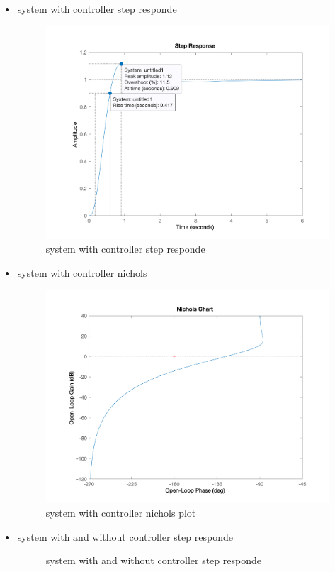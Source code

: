 \begin{itemize}
    \item system with controller step responde
    \begin{figure}[H]
        \caption{system with controller step responde}
        \centering
        \includegraphics[width=12cm]{../Figure/Q3/Q3_system_controller_respond.png}
    \end{figure}
    \item system with controller nichols
    \begin{figure}[H]
        \caption{system with controller nichols plot}
        \centering
        \includegraphics[width=12cm]{../Figure/Q3/Q3_system_controller_nichols.png}
    \end{figure}
    \item system with and without controller step responde
    \begin{figure}[H]
        \caption{system with and without controller step responde}

\end{figure}
\end{itemize}
